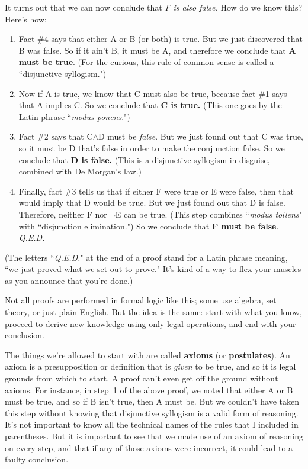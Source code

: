 It turns out that we can now conclude that \textit{F is also false.} How
do we know this? Here's how:
\begin{enumerate}
\item Fact \#4 says that either A or B (or both) is true. But we just
discovered that B was false. So if it ain't B, it must be A, and therefore
we conclude that \textbf{A must be true}. (For the curious, this rule of
common sense is called a ``disjunctive syllogism.")
\item Now if A is true, we know that C must also be true, because fact \#1
says that A implies C. So we conclude that \textbf{C is true.} (This one
goes by the Latin phrase ``\textit{modus ponens}.")
\item Fact \#2 says that C$\wedge$D must be \textit{false}. But we just
found out that C was true, so it must be D that's false in order to make
the conjunction false. So we conclude that \textbf{D is false.} (This is a
disjunctive syllogism in disguise, combined with De Morgan's law.)
\item Finally, fact \#3 tells us that if either F were true or E were false,
then that would imply that D would be true. But we just found out that D is
false. Therefore, neither F nor $\neg$E can be true. (This step combines
``\textit{modus tollens}" with ``disjunction elimination.")
So we conclude that \textbf{F must be false}. \textit{Q.E.D.}
\end{enumerate}
(The letters ``\textit{Q.E.D.}" at the end of a proof stand for a Latin
phrase meaning, ``we just proved what we set out to prove." It's kind of a
way to flex your muscles as you announce that you're done.)

Not all proofs are performed in formal logic like this; some use algebra,
set theory, or just plain English. But the idea is the same: start with
what you know, proceed to derive new knowledge using only legal operations,
and end with your conclusion.

The things we're allowed to start with are called \textbf{axioms} (or
\textbf{postulates}). An axiom is a presupposition or definition that is
\textit{given} to be true, and so it is legal grounds from which to start.
A proof can't even get off the ground without axioms. For instance, in
step~1 of the above proof, we noted that either A or B must be true, and so
if B isn't true, then A must be.  But we couldn't have taken this step
without knowing that disjunctive syllogism is a valid form of reasoning.
It's not important to know all the technical names of the rules that I
included in parentheses. But it is important to see that we made use of an
axiom of reasoning on every step, and that if any of those axioms were
incorrect, it could lead to a faulty conclusion.

